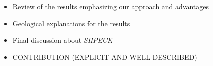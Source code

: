 \documentclass[ppgc,mestrado,english]{iiufrgs}
\begin{document}
\begin{itemize}
\item Review of the results emphasizing our approach and advantages
\item  Geological explanations for the results
\item  Final discussion about \emph{SHPECK}
\item  CONTRIBUTION (EXPLICIT AND WELL DESCRIBED) 
\end{itemize}






\makeglossaries
\end{document}
